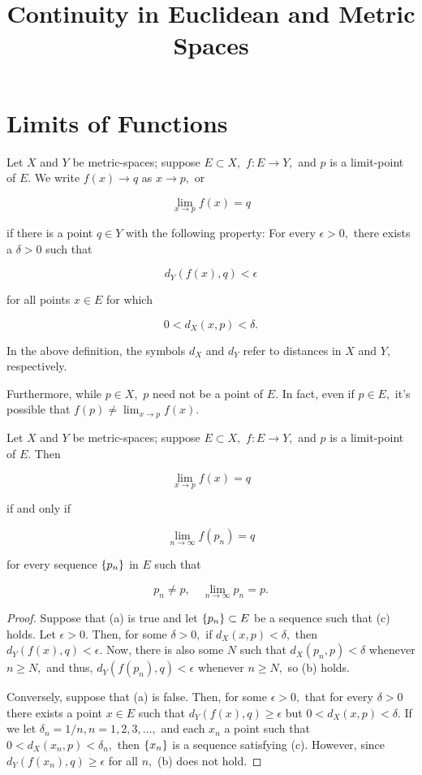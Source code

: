 \documentclass{article}
\title{Continuity in Euclidean and Metric Spaces}
\begin{document}
\section{Limits of Functions}

\begin{definition}[Limit]
Let $X$ and $Y$ be \@{metric-spaces}; suppose $E \subset X,$ $f : E \to Y,$ and $p$ is a \@{limit-point} of $E.$ We write $f(x) \to q$ as $x \to p,$ or

\[ \lim_{x \to p} f(x) = q \]

if there is a point $q \in Y$ with the following property: For every $\epsilon > 0,$ there exists a $\delta > 0$ such that

\[ d_Y(f(x), q) < \epsilon \]

for all points $x \in E$ for which

\[ 0 < d_X(x,p) < \delta. \]
\end{definition}

\begin{note}
In the above definition, the symbols $d_X$ and $d_Y$ refer to distances in $X$ and $Y,$ respectively.

Furthermore, while $p \in X,$ $p$ need not be a point of $E.$ In fact, even if $p \in E,$ it's possible that $f(p) \neq \lim_{x \to p} f(x).$
\end{note}

\begin{theorem}\label{limit-of-a-function-characterized-by-limits-of-sequences}
Let $X$ and $Y$ be \@{metric-spaces}; suppose $E \subset X,$ $f : E \to Y,$ and $p$ is a \@{limit-point} of $E.$ Then

\[ \lim_{x \to p} f(x) = q \tag{a} \]

if and only if

\[ \lim_{n \to \infty} f(p_n) = q \tag{b} \]

for every \@{sequence} $\left\{ p_n \right\}$ in $E$ such that

\[ p_n \neq p, \quad \lim_{n \to \infty} p_n = p. \tag{c} \]
\end{theorem}

\begin{proof}
Suppose that (a) is true and let $\left\{ p_n \right\} \subset E$ be a \@{sequence} such that (c) holds. Let $\epsilon > 0.$ Then, for some $\delta > 0,$ if $d_X(x,p) < \delta,$ then $d_Y(f(x), q) < \epsilon.$ Now, there is also some $N$ such that $d_X(p_n, p) < \delta$ whenever $n \geq N,$ and thus, $d_Y(f(p_n), q) < \epsilon$ whenever $n \geq N,$ so (b) holds.

Conversely, suppose that (a) is false. Then, for some $\epsilon > 0,$ that for every $\delta > 0$ there exists a point $x \in E$ such that $d_Y(f(x), q) \geq \epsilon$ but $0 < d_X(x, p) < \delta.$ If we let $\delta_n = 1/n, n = 1, 2, 3, \dots,$ and each $x_n$ a point such that $0 < d_X(x_n, p) < \delta_n,$ then $\left\{ x_n \right\}$ is a \@{sequence} satisfying (c). However, since $d_Y(f(x_n), q) \geq \epsilon$ for all $n,$ (b) does not hold.
\end{proof}
\end{document}
